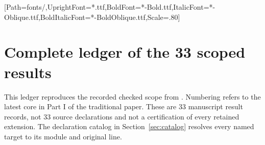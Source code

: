 

\usepackage{komorebi-monograph}
\renewcommand{\KomorebiTitle}{Transfer Semigroups and Memory}
\renewcommand{\KomorebiCoverTitle}{Transfer Semigroups\\and Memory}
\renewcommand{\KomorebiKind}{Lean and evidence guide}
\renewcommand{\KomorebiSubtitle}{Probabilistic refinement, fractional operators,\\and exact hidden-state elimination}
\renewcommand{\KomorebiShortTitle}{Paper VI / Lean guide}
\renewcommand{\KomorebiCoverBlurb}{Follow the actual declarations from semigroup transfer to Bayesian sufficiency, fractional calculus, finite paths, and hidden-state memory. Each interface carries its own hypotheses and its own evidence.}
\KomorebiSetup
\setlength{\cftsubsecnumwidth}{4.4em}
\setmonofont{DejaVuSansMono}[Path=fonts/,UprightFont=*.ttf,BoldFont=*-Bold.ttf,ItalicFont=*-Oblique.ttf,BoldItalicFont=*-BoldOblique.ttf,Scale=.80]

\KomorebiCover
{}

\setcounter{tocdepth}{1}
\begingroup\small
\tableofcontents
\endgroup
\clearpage
{}

\clearpage
\clearpage
\clearpage
\clearpage
\clearpage
\clearpage
\clearpage
\clearpage


\clearpage
\section{Complete ledger of the 33 scoped results}
\label{sec:ledger}
This ledger reproduces the recorded checked scope from . Numbering refers to the latest core in Part I of the traditional paper. These are 33 manuscript result records, not 33 source declarations and not a certification of every retained extension. The declaration catalog in Section~\ref{sec:catalog} resolves every named target to its module and original line.

\clearpage
